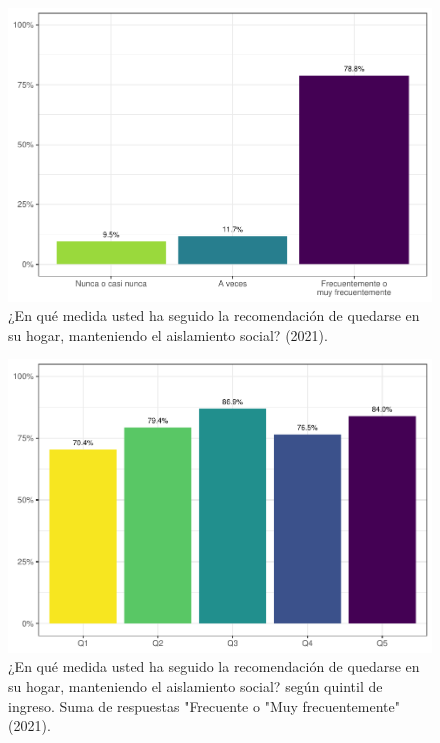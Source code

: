 \documentclass[
  12pt,
]{book}
\begin{document}
\begin{figure}

{\centering \includegraphics{reporte-elsoc_files/figure-latex/dist-total-1} 

}

\caption{¿En qué medida usted ha seguido la recomendación de quedarse en su hogar, manteniendo el aislamiento social? (2021).}\label{fig:dist-total}
\end{figure}

\begin{figure}

{\centering \includegraphics{reporte-elsoc_files/figure-latex/dist-quintil-1} 

}

\caption{¿En qué medida usted ha seguido la recomendación de quedarse en su hogar, manteniendo el aislamiento social? según quintil de ingreso. Suma de respuestas "Frecuente o "Muy frecuentemente" (2021).}\label{fig:dist-quintil}
\end{figure}
\end{document}
